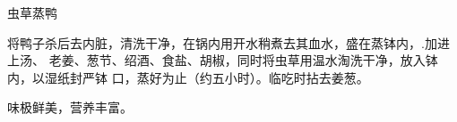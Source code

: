 \begin{recipe}{虫草蒸鸭}

\ingredients


\cooking

将鸭子杀后去内脏，清洗干净，在锅内用开水稍煮去其血水，盛在蒸钵内，.加进上汤、
老姜、葱节、绍酒、食盐、胡椒，同时将虫草用温水淘洗干净，放入钵内，以湿纸封严钵
口，蒸好为止（约五小时）。临吃时拈去姜葱。

\features

味极鲜美，营养丰富。

\end{recipe}

